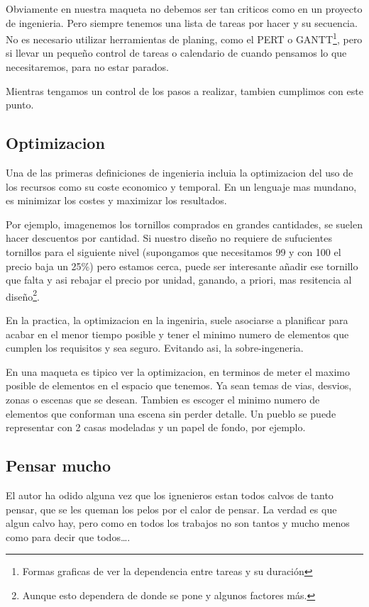Obviamente en nuestra maqueta no debemos ser tan criticos como en un proyecto de ingenieria.
Pero siempre tenemos una lista de tareas por hacer y su secuencia. No es necesario utilizar
herramientas de planing, como el PERT o GANTT\footnote{Formas graficas de ver la dependencia
    entre tareas y su duración}, pero si llevar un pequeño control de tareas o calendario de
cuando pensamos lo que necesitaremos, para no estar parados.

Mientras tengamos un control de los pasos a realizar, tambien cumplimos con este punto.
\subsection{Optimizacion}
Una de las primeras definiciones de ingenieria incluia la optimizacion del uso de los recursos
como su coste economico y temporal. En un lenguaje mas mundano, es minimizar los costes y
maximizar los resultados.

Por ejemplo, imagenemos los tornillos comprados en grandes cantidades, se suelen hacer
descuentos por cantidad. Si nuestro diseño no requiere de sufucientes tornillos para el
siguiente nivel (supongamos que necesitamos 99 y con 100 el precio baja un 25\%) pero estamos
cerca, puede ser interesante añadir ese tornillo que falta y asi rebajar el precio por unidad,
ganando, a priori, mas resitencia al diseño\footnote{Aunque esto dependera de donde se pone y
    algunos factores más.}.

En la practica, la optimizacion en la ingeniria, suele asociarse a planificar para acabar en
el menor tiempo posible y tener el minimo numero de elementos que cumplen los requisitos y sea
seguro. Evitando asi, la sobre-ingeneria.

En una maqueta es tipico ver la optimizacion, en terminos de meter el maximo posible de
elementos en el espacio que tenemos. Ya sean temas de vias, desvios, zonas o escenas  que se
desean. Tambien es escoger el minimo numero de elementos que conforman una escena sin perder
detalle. Un pueblo se puede representar con 2 casas modeladas y un papel de fondo, por ejemplo.
\subsection{Pensar mucho}
El autor ha odido alguna vez que los ignenieros estan todos calvos de tanto pensar, que se les
queman los pelos por el calor de pensar. La verdad es que algun calvo hay, pero como en todos
los trabajos no son tantos y mucho menos como para decir que todos\dots.

